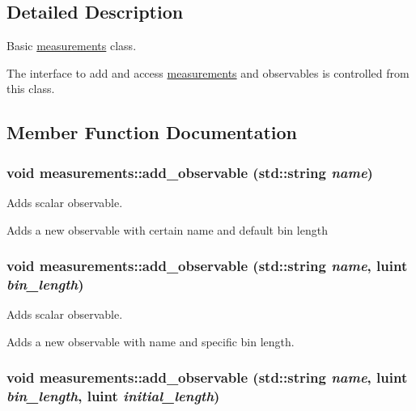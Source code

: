 \subsection{Detailed Description}
Basic \hyperlink{classmeasurements}{measurements} class. 

The interface to add and access \hyperlink{classmeasurements}{measurements} and observables is controlled from this class. 

\subsection{Member Function Documentation}
\hypertarget{classmeasurements_e44e2ffcf3e14cf741a1192a319aaf20}{
\subsubsection[add\_\-observable]{\setlength{\rightskip}{0pt plus 5cm}void measurements::add\_\-observable (std::string {\em name})}}
\label{classmeasurements_e44e2ffcf3e14cf741a1192a319aaf20}


Adds scalar observable. 

Adds a new observable with certain name and default bin length \hypertarget{classmeasurements_9dc7d64a614f14c55778e9584a5bf793}{
\subsubsection[add\_\-observable]{\setlength{\rightskip}{0pt plus 5cm}void measurements::add\_\-observable (std::string {\em name}, \/  luint {\em bin\_\-length})}}
\label{classmeasurements_9dc7d64a614f14c55778e9584a5bf793}


Adds scalar observable. 

Adds a new observable with name and specific bin length. \hypertarget{classmeasurements_abfc185b78e039b7e17cf2e4ec1c5adb}{
\subsubsection[add\_\-observable]{\setlength{\rightskip}{0pt plus 5cm}void measurements::add\_\-observable (std::string {\em name}, \/  luint {\em bin\_\-length}, \/  luint {\em initial\_\-length})}}
\label{classmeasurements_abfc185b78e039b7e17cf2e4ec1c5adb}


